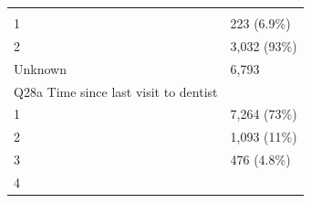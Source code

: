 \documentclass[]{article}
\begin{document}
\begin{longtable}[]{@{}ll@{}}
\begin{minipage}[t]{0.23\columnwidth}
\strut
\end{minipage}\tabularnewline
\begin{minipage}[t]{0.71\columnwidth}\raggedright
1\strut
\end{minipage} & \begin{minipage}[t]{0.23\columnwidth}\raggedright
223 (6.9\%)\strut
\end{minipage}\tabularnewline
\begin{minipage}[t]{0.71\columnwidth}\raggedright
2\strut
\end{minipage} & \begin{minipage}[t]{0.23\columnwidth}\raggedright
3,032 (93\%)\strut
\end{minipage}\tabularnewline
\begin{minipage}[t]{0.71\columnwidth}\raggedright
Unknown\strut
\end{minipage} & \begin{minipage}[t]{0.23\columnwidth}\raggedright
6,793\strut
\end{minipage}\tabularnewline
\begin{minipage}[t]{0.71\columnwidth}\raggedright
Q28a Time since last visit to dentist\strut
\end{minipage} & \begin{minipage}[t]{0.23\columnwidth}\raggedright
\strut
\end{minipage}\tabularnewline
\begin{minipage}[t]{0.71\columnwidth}\raggedright
1\strut
\end{minipage} & \begin{minipage}[t]{0.23\columnwidth}\raggedright
7,264 (73\%)\strut
\end{minipage}\tabularnewline
\begin{minipage}[t]{0.71\columnwidth}\raggedright
2\strut
\end{minipage} & \begin{minipage}[t]{0.23\columnwidth}\raggedright
1,093 (11\%)\strut
\end{minipage}\tabularnewline
\begin{minipage}[t]{0.71\columnwidth}\raggedright
3\strut
\end{minipage} & \begin{minipage}[t]{0.23\columnwidth}\raggedright
476 (4.8\%)\strut
\end{minipage}\tabularnewline
\begin{minipage}[t]{0.71\columnwidth}\raggedright
4\strut
\end{minipage} & \begin{minipage}[t]{0.23\columnwidth}\raggedright

\end{minipage}
\end{longtable}
\end{document}
